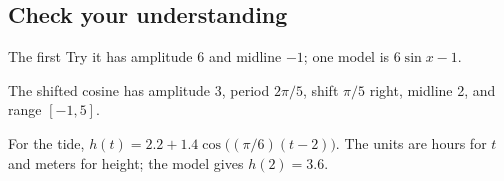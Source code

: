 \hypertarget{m3-check-your-understanding}{%
\subsection{Check your understanding}\label{m3-check-your-understanding}}

The first Try it has amplitude 6 and midline \(-1\); one model is \(6\sin x-1\).

The shifted cosine has amplitude 3, period \(2\pi/5\), shift \(\pi/5\) right, midline 2, and range \([-1,5]\).

For the tide, \(h(t)=2.2+1.4\cos\bigl((\pi/6)(t-2)\bigr)\). The units are hours for \(t\) and meters for height; the model gives \(h(2)=3.6\).

\clearpage
